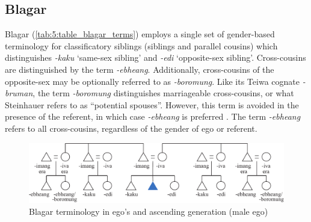 \clearpage
\subsection{Blagar}\label{sect_blagar}
Blagar (\ref{tab:5:table_blagar_terms}) employs a single set of gender-based terminology for classificatory siblings (siblings and parallel cousins) which distinguishes \textit{-kaku} `same-sex sibling' and \textit{-edi} `opposite-sex sibling'. Cross-cousins are distinguished by the term \textit{-ebheang}. Additionally, cross-cousins of the opposite-sex may be optionally referred to as \textit{-boromung}. Like its Teiwa cognate \textit{-bruman}, the term \textit{-boromung} distinguishes marriageable cross-cousins, or what Steinhauer refers to as ``potential spouses''. However, this term is avoided in the presence of the referent, in which case \textit{-ebheang} is preferred \citep[156]{Steinhauer1993}. The term \textit{-ebheang} refers to all cross-cousins, regardless of the gender of ego or referent.


\begin{figure}[h]
\includegraphics[width=\textwidth]{figures/Holton_ch5_fig7.pdf}
\caption{Blagar terminology in ego's and ascending generation (male ego) }
\label{fig:5:7}
\end{figure}  
 

 

